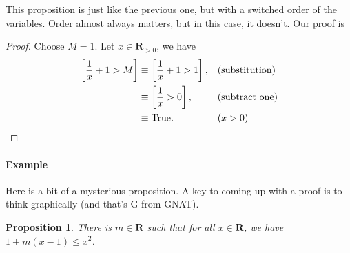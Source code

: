 \documentclass[12pt,fleqn]{article}
\newcommand{\reals}{\mathbf{R}}
\newcommand{\true}{\mathrm{True}}
\newenvironment{myproof}
  {\begin{shaded}\begin{proof}}
  {\end{proof}\end{shaded}}
\newtheorem{prop}{Proposition}
\newcounter{ex}\setcounter{ex}{0}
\newcommand{\ex}{%
\setcounter{ex}{\value{ex}+1}
\paragraph{Example \theex}}
\begin{document}
    This proposition  is just like the previous one, but with a switched order of the variables.  Order almost always matters, but in this case, it 
    doesn't. Our proof is
    
    \begin{myproof} Choose $M=1$. Let $x  \in \reals_{>0}$, we have
    \begin{align*}
      \left [ \frac{1}{x} + 1 > M \right] &\equiv    \left [ \frac{1}{x} + 1 > 1 \right], &&(\text{substitution}) \\
                                                               &\equiv    \left [ \frac{1}{x}  > 0 \right], &&(\text{subtract one}) \\
                                                               &\equiv \true.    &&  (x > 0) \qedhere
  \end{align*} 
    
    
    \end{myproof}


    \ex Here is a bit of a mysterious proposition. A key to coming 
    up with a proof is to think graphically (and that's G from GNAT).
        \begin{prop}
      There is $m \in \reals$ such that for all $x \in \reals$, we 
     have $1 + m(x-1) \leq x^2$. 
     \end{prop}
     
\end{document}
